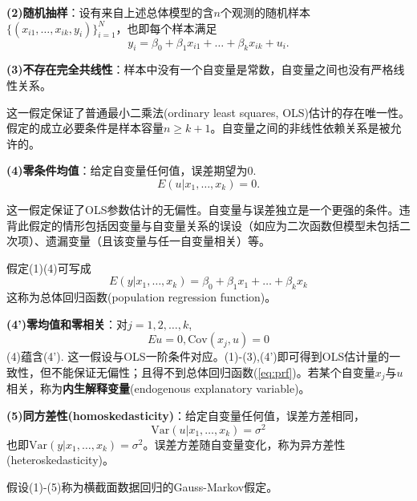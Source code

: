 \par \textbf{(2)随机抽样}：设有来自上述总体模型的含$n$个观测的随机样本$\{(x_{i1}, \dots, x_{ik}, y_i)\}_{i=1}^N$，也即每个样本满足
\begin{equation}
    y_i=\beta_0+\beta_1 x_{i1}+\dots+\beta_k x_{ik} +u_i.
\end{equation}

\par \textbf{(3)不存在完全共线性}：样本中没有一个自变量是常数，自变量之间也没有严格线性关系。
\par 这一假定保证了普通最小二乘法(ordinary least squares, OLS)估计的存在唯一性。假定的成立必要条件是样本容量$n\ge k+1$。自变量之间的非线性依赖关系是被允许的。

\par \textbf{(4)零条件均值}：给定自变量任何值，误差期望为0.
\begin{equation}
    E(u\vert x_1, \dots, x_k)=0.
\end{equation}
\par 这一假定保证了OLS参数估计的无偏性。自变量与误差独立是一个更强的条件。违背此假定的情形包括因变量与自变量关系的误设（如应为二次函数但模型未包括二次项）、遗漏变量（且该变量与任一自变量相关）等。
\par 假定(1)(4)可写成
\begin{equation}
    E(y\vert x_1,\dots,x_k)=\beta_0+\beta_1 x_1+\dots+\beta_k x_k \label{eq:prf}
\end{equation}
这称为总体回归函数(population regression function)。

\par \textbf{(4')零均值和零相关}：对$j=1,2,\dots,k$,
\begin{equation}
    Eu=0, \text{Cov}(x_j,u)=0
\end{equation}
(4)蕴含(4'). 这一假设与OLS一阶条件对应。(1)-(3),(4')即可得到OLS估计量的一致性，但不能保证无偏性；且得不到总体回归函数(\ref{eq:prf})。若某个自变量$x_j$与$u$相关，称为\textbf{内生解释变量}(endogenous explanatory variable)。

\par \textbf{(5)同方差性(homoskedasticity)}：给定自变量任何值，误差方差相同，
\begin{equation}
    \text{Var}(u\vert x_1, \dots, x_k)=\sigma^2
\end{equation}
也即$\text{Var}(y\vert x_1, \dots, x_k)=\sigma^2$。误差方差随自变量变化，称为异方差性(heteroskedasticity)。
\par 假设(1)-(5)称为横截面数据回归的Gauss-Markov假定。

